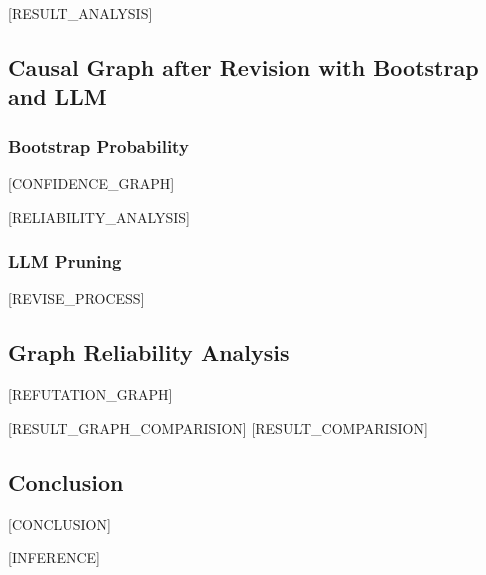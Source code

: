 \documentclass{ctexart}
\begin{document}
[RESULT_ANALYSIS]

\clearpage

\subsection{Causal Graph after Revision with Bootstrap and LLM}

\subsubsection{Bootstrap Probability}
[CONFIDENCE_GRAPH]

[RELIABILITY_ANALYSIS]

\subsubsection{LLM Pruning}

[REVISE_PROCESS]


\subsection{Graph Reliability Analysis}

[REFUTATION_GRAPH]

[RESULT_GRAPH_COMPARISION]
[RESULT_COMPARISION]

\subsection{Conclusion}
[CONCLUSION]

[INFERENCE]
\end{document}
